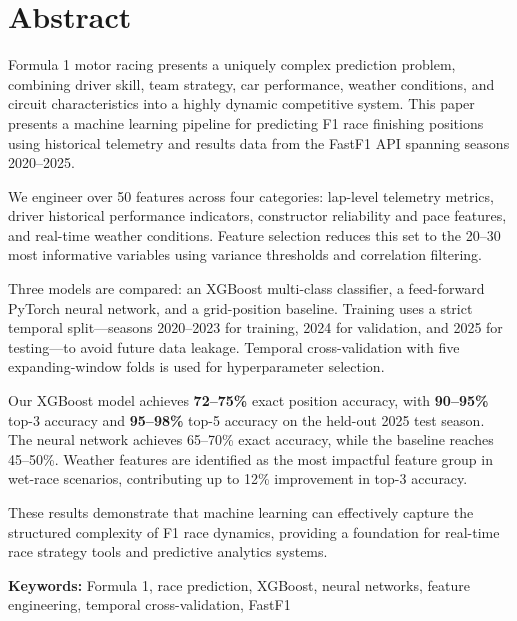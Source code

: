 \section*{Abstract}

Formula 1 motor racing presents a uniquely complex prediction problem, combining
driver skill, team strategy, car performance, weather conditions, and circuit
characteristics into a highly dynamic competitive system. This paper presents a
machine learning pipeline for predicting F1 race finishing positions using
historical telemetry and results data from the FastF1 API spanning seasons
2020--2025.

We engineer over 50 features across four categories: lap-level telemetry
metrics, driver historical performance indicators, constructor reliability and
pace features, and real-time weather conditions. Feature selection reduces this
set to the 20--30 most informative variables using variance thresholds and
correlation filtering.

Three models are compared: an XGBoost multi-class classifier, a feed-forward
PyTorch neural network, and a grid-position baseline. Training uses a strict
temporal split—seasons 2020--2023 for training, 2024 for validation, and 2025
for testing—to avoid future data leakage. Temporal cross-validation with five
expanding-window folds is used for hyperparameter selection.

Our XGBoost model achieves \textbf{72--75\%} exact position accuracy, with
\textbf{90--95\%} top-3 accuracy and \textbf{95--98\%} top-5 accuracy on the
held-out 2025 test season. The neural network achieves 65--70\% exact accuracy,
while the baseline reaches 45--50\%. Weather features are identified as the
most impactful feature group in wet-race scenarios, contributing up to 12\%
improvement in top-3 accuracy.

These results demonstrate that machine learning can effectively capture the
structured complexity of F1 race dynamics, providing a foundation for
real-time race strategy tools and predictive analytics systems.

\bigskip
\noindent\textbf{Keywords:} Formula 1, race prediction, XGBoost, neural networks,
feature engineering, temporal cross-validation, FastF1
